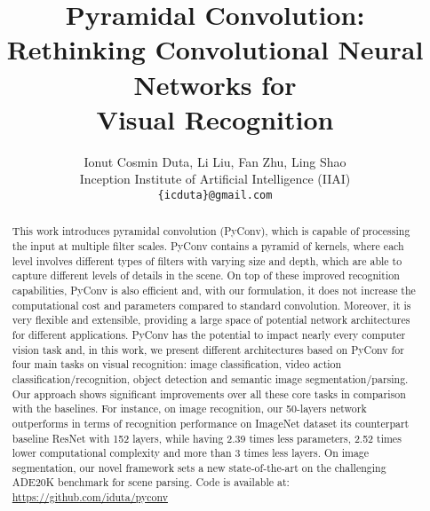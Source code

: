 \documentclass{article}
\title{Pyramidal Convolution: \\ Rethinking Convolutional Neural Networks for \\ Visual Recognition}
\author{Ionut Cosmin Duta, Li Liu, Fan Zhu, Ling Shao \\
  Inception Institute of Artificial Intelligence (IIAI) \\
  \texttt{\{icduta\}@gmail.com}\\
}
\begin{document}
\maketitle

\begin{abstract}
This work introduces pyramidal convolution (PyConv), which is capable of processing the input at multiple filter scales. PyConv contains a pyramid of kernels, where each level involves different types of filters with varying size and depth, which are able to capture different levels of details in the scene. On top of these improved recognition capabilities, PyConv is also efficient and, with our formulation, it does not increase the  computational cost and  parameters compared to standard convolution. Moreover, it is very flexible and extensible, providing a large space of potential network architectures for different applications. PyConv has the potential to impact nearly every computer vision task and,  in this work, we present different architectures based on PyConv for four main tasks on visual recognition: image classification, video action classification/recognition, object detection and semantic image segmentation/parsing. Our approach shows  significant improvements over all these core tasks in comparison with the baselines. For instance, on image recognition, our 50-layers network outperforms in terms of recognition performance on ImageNet dataset its counterpart baseline ResNet with 152 layers, while having 2.39 times less parameters, 2.52 times lower computational complexity and more than 3 times less layers. On image segmentation, our novel framework sets a new state-of-the-art on the challenging ADE20K benchmark for scene parsing. 
\newline
 Code is available at: {\color{blue}\url{https://github.com/iduta/pyconv}}
\end{abstract}
\end{document}
